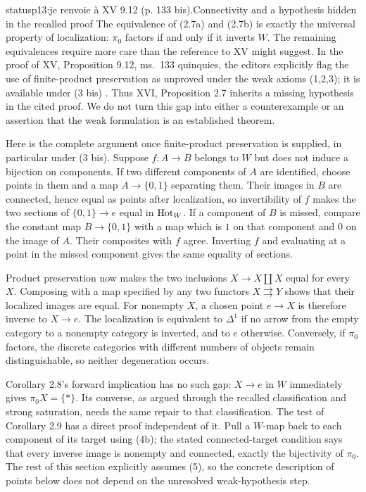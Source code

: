 \begin{dcomment}{status}{p13:je renvoie à XV 9.12 (p. 133 bis).}{Connectivity and a hypothesis hidden in the recalled proof}
The equivalence of (2.7a) and (2.7b) is exactly the universal property of localization: $\pi_0$ factors if and only if it inverts $W$. The remaining equivalences require more care than the reference to XV might suggest. In the proof of XV, Proposition 9.12, ms.~133 quinquies, the editors explicitly flag the use of finite-product preservation as unproved under the weak axioms (1,2,3); it is available under (3 bis) \citep{Grothendieck1990XV}. Thus XVI, Proposition 2.7 inherits a missing hypothesis in the cited proof. We do not turn this gap into either a counterexample or an assertion that the weak formulation is an established theorem.

Here is the complete argument once finite-product preservation is supplied, in particular under (3 bis). Suppose $f:A\to B$ belongs to $W$ but does not induce a bijection on components. If two different components of $A$ are identified, choose points in them and a map $A\to\{0,1\}$ separating them. Their images in $B$ are connected, hence equal as points after localization, so invertibility of $f$ makes the two sections of $\{0,1\}\to e$ equal in $\mathrm{Hot}_W$. If a component of $B$ is missed, compare the constant map $B\to\{0,1\}$ with a map which is $1$ on that component and $0$ on the image of $A$. Their composites with $f$ agree. Inverting $f$ and evaluating at a point in the missed component gives the same equality of sections.

Product preservation now makes the two inclusions $X\to X\amalg X$ equal for every $X$. Composing with a map specified by any two functors $X\rightrightarrows Y$ shows that their localized images are equal. For nonempty $X$, a chosen point $e\to X$ is therefore inverse to $X\to e$. The localization is equivalent to $\Delta^1$ if no arrow from the empty category to a nonempty category is inverted, and to $e$ otherwise. Conversely, if $\pi_0$ factors, the discrete categories with different numbers of objects remain distinguishable, so neither degeneration occurs.

Corollary 2.8's forward implication has no such gap: $X\to e$ in $W$ immediately gives $\pi_0X=\{*\}$. Its converse, as argued through the recalled classification and strong saturation, needs the same repair to that classification. The test of Corollary 2.9 has a direct proof independent of it. Pull a $W$-map back to each component of its target using (4b); the stated connected-target condition says that every inverse image is nonempty and connected, exactly the bijectivity of $\pi_0$. The rest of this section explicitly assumes (5), so the concrete description of points below does not depend on the unresolved weak-hypothesis step.
\end{dcomment}


